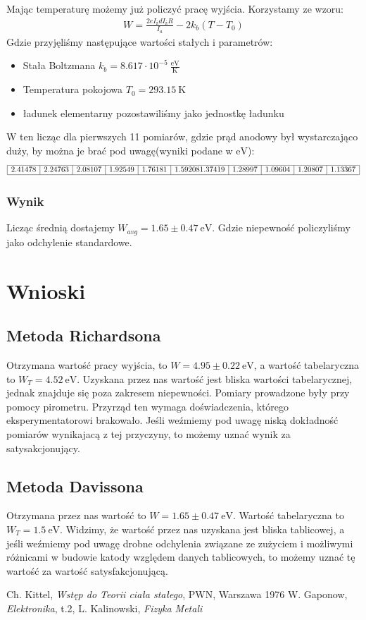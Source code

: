 \documentclass[paper=a4, fontsize=12pt]{scrartcl}
\begin{document}
Mając temperaturę możemy już policzyć pracę wyjścia. Korzystamy ze wzoru:
\begin{align*}
W=\frac{2eI_\mathrm{ż}dI_\mathrm{ż}R}{I_a}-2k_b(T-T_0)
\end{align*}
Gdzie przyjęliśmy następujące wartości stałych i parametrów:
\begin{itemize}
	\item Stała Boltzmana $k_b=8.617\cdot10^{-5}\:\mathrm{\frac{eV}{K}}$
	\item Temperatura pokojowa $T_0=293.15\:\mathrm{K}$
	\item ładunek elementarny pozostawiliśmy jako jednostkę ładunku
\end{itemize}
W ten licząc dla pierwszych 11 pomiarów, gdzie prąd anodowy był wystarczająco duży, by można je brać pod uwagę(wyniki podane w $\mathrm{eV}$):
\begin{align*}
\begin{array}{|c|c|c|c|c|c|c|c|c|c|c|}
\hline
2.41478 & 2.24763 & 2.08107 & 1.92549 & 1.76181 & 1.59208 
 1.37419 & 1.28997 & 1.09604 & 1.20807 & 1.13367 \\ \hline
\end{array}
\end{align*}
\subsubsection{Wynik}
Licząc średnią dostajemy $W_{avg}=1.65\pm0.47\:\mathrm{eV}$. Gdzie niepewność policzyliśmy jako odchylenie standardowe.

\section{Wnioski}
\subsection{Metoda Richardsona}
Otrzymana wartość pracy wyjścia, to $W=4.95\pm0.22\:\mathrm{eV}$, a wartość tabelaryczna to $W_T=4.52\:\mathrm{eV}$.
Uzyskana przez nas wartość jest bliska wartości tabelarycznej, jednak znajduje się poza zakresem niepewności. Pomiary prowadzone były przy pomocy pirometru. Przyrząd ten wymaga doświadczenia, którego eksperymentatorowi brakowało. Jeśli weźmiemy pod uwagę niską dokładność pomiarów wynikajacą z tej przyczyny, to możemy uznać wynik za satysakcjonujący.
\subsection{Metoda Davissona}
Otrzymana przez nas wartość to $W=1.65\pm0.47\:\mathrm{eV}$. Wartość tabelaryczna to $W_T=1.5\:\mathrm{eV}$.
Widzimy, że wartość przez nas uzyskana jest bliska tablicowej, a jeśli weźmiemy pod uwagę drobne odchylenia związane ze zużyciem i możliwymi różnicami w budowie katody względem danych tablicowych, to możemy uznać tę wartość za wartość satysfakcjonującą.
\begin{thebibliography}{99}
	 Ch. Kittel, \textit{Wstęp do Teorii ciała stałego}, PWN, Warszawa 1976 
	 W. Gaponow, \textit{Elektronika}, t.2,  
	 L. Kalinowski, \textit{Fizyka Metali}
\end{thebibliography}
\end{document}

